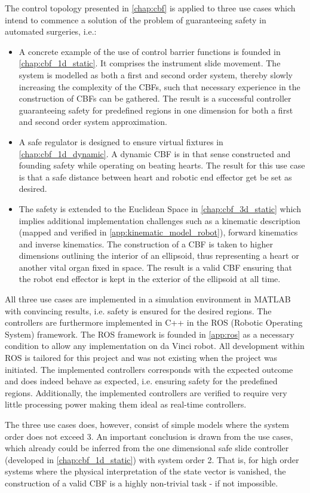 The control topology presented in \autoref{chap:cbf} is applied to three use cases which intend to commence a solution of the problem of guaranteeing safety in automated surgeries, i.e.:
\begin{itemize}
\item A concrete example of the use of control barrier functions is founded in \autoref{chap:cbf_1d_static}. It comprises the instrument slide movement. The system is modelled as both a first and second order system, thereby slowly increasing the complexity of the CBFs, such that necessary experience in the construction of CBFs can be gathered. The result is a successful controller guaranteeing safety for predefined regions in one dimension for both a first and second order system approximation.
\item A safe regulator is designed to ensure virtual fixtures in \autoref{chap:cbf_1d_dynamic}. A dynamic CBF is in that sense constructed and founding safety while operating on beating hearts. The result for this use case is that a safe distance between heart and robotic end effector get be set as desired.
\item The safety is extended to the Euclidean Space in \autoref{chap:cbf_3d_static} which implies additional implementation challenges such as a kinematic description (mapped and verified in \autoref{app:kinematic_model_robot}), forward kinematics and inverse kinematics. The construction of a CBF is taken to higher dimensions outlining the interior of an ellipsoid, thus representing a heart or another vital organ fixed in space. The result is a valid CBF ensuring that the robot end effector is kept in the exterior of the ellipsoid at all time.
\end{itemize}
All three use cases are implemented in a simulation environment in MATLAB with convincing results, i.e. safety is ensured for the desired regions. The controllers are furthermore implemented in C++ in the ROS (Robotic Operating System) framework. The ROS framework is founded in \autoref{app:ros} as a necessary condition to allow any implementation on da Vinci robot. All development within ROS is tailored for this project and was not existing when the project was initiated. The implemented controllers corresponds with the expected outcome and does indeed behave as expected, i.e. ensuring safety for the predefined regions. Additionally, the implemented controllers are verified to require very little processing power making them ideal as real-time controllers.

The three use cases does, however, consist of simple models where the system order does not exceed 3. An important conclusion is drawn from the use cases, which already could be inferred from the one dimensional safe slide controller (developed in \autoref{chap:cbf_1d_static}) with system order 2. That is, for high order systems where the physical interpretation of the state vector is vanished, the construction of a valid CBF is a highly non-trivial task - if not impossible. 


